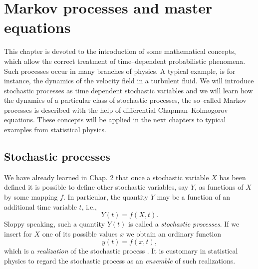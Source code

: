 \chapter{Markov processes and master equations}
This chapter is devoted
to the introduction of some mathematical concepts, which allow the
correct treatment of time--dependent probabilistic phenomena. 
Such processes occur in many branches of physics. A typical example,
is for instance, the dynamics of the velocity field in a turbulent fluid.
We will introduce stochastic processes as time dependent stochastic 
variables and we will 
learn how the dynamics of a particular class of stochastic 
processes, the so--called Markov processes  is described 
with the help of differential Chapman--Kolmogorov equations. 
These concepts will be applied
in the next chapters to typical examples from statistical physics.

\section{Stochastic processes}
We have already learned in Chap. 2 that once a stochastic variable 
$X$ has been defined it is possible to define other stochastic 
variables, say $Y$, as functions of $X$ by some mapping $f$. In 
particular, the quantity $Y$ may be a function of an additional
time variable $t$, i.e.,
\begin{equation*}
Y(t) = f(X,t).
\end{equation*}
Sloppy speaking, such a quantity $Y(t)$ is called a {\em stochastic
processes}. If we insert for $X$ one of its possible values $x$
we obtain an ordinary function
\begin{equation*}
y(t) = f(x,t),
\end{equation*}
which is a {\em realization} of the stochastic process
\cite{VAN_KAMPEN}. It is 
customary in statistical physics to regard the stochastic process 
as an {\em ensemble} of such realizations.


